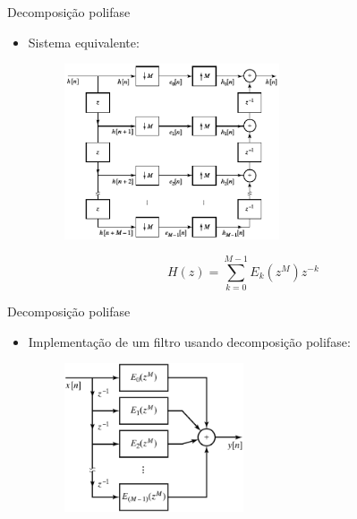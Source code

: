 \documentclass[
size=11pt,
paper=screen,
mode=present,
display=slidesnotes,
style=paintings,
nopagebreaks,
blackslide,
fleqn]{powerdot}
\begin{document}
\begin{slide}{Decomposição polifase}
	\begin{itemize}
		\item Sistema equivalente:
			\begin{figure}
				\centering
				\includegraphics[width=0.6\textwidth]{figs/4-36.eps}
			\end{figure}
			\begin{equation*}
				H(z)= \sum_{k=0}^{M-1} E_k(z^M)z^{-k}
			\end{equation*}
	\end{itemize}
\end{slide}

\begin{slide}{Decomposição polifase}
	\begin{itemize}
		\item Implementação de um filtro usando decomposição polifase:
			\begin{figure}
				\centering
				\includegraphics[width=0.5\textwidth]{figs/4-37.eps}
			\end{figure}
	\end{itemize}
\end{slide}
\end{document}
